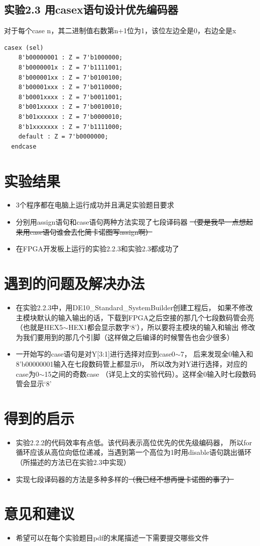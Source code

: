 \documentclass[12pt,a4paper,UTF8]{article}
\begin{document}
\subsection{实验2.3 用casex语句设计优先编码器}
对于每个case n，其二进制值右数第n+1位为1，该位左边全是0，右边全是x
\begin{lstlisting}[style=verilog-style]
  casex (sel)
    8'b00000001 : Z = 7'b1000000;
    8'b0000001x : Z = 7'b1111001;
    8'b000001xx : Z = 7'b0100100;
    8'b00001xxx : Z = 7'b0110000;
    8'b0001xxxx : Z = 7'b0011001;
    8'b001xxxxx : Z = 7'b0010010;
    8'b01xxxxxx : Z = 7'b0000010;
    8'b1xxxxxxx : Z = 7'b1111000;
    default : Z = 7'b0000000;
  endcase
\end{lstlisting}

\section{实验结果}
\begin{itemize}
  \item 3个程序都在电脑上运行成功并且满足实验题目要求
  \item 分别用assign语句和case语句两种方法实现了七段译码器
        \sout{（要是我早一点想起来用case语句谁会去化简卡诺图写assign啊）}
  \item 在FPGA开发板上运行的实验2.2.3和实验2.3都成功了
\end{itemize}

\section{遇到的问题及解决办法}
\begin{itemize}
  \item 在实验2.2.3中，用DE10\_Standard\_SystemBuilder创建工程后，
        如果不修改主模块默认的输入输出的话，下载到FPGA之后空接的那几个七段数码管会亮
        （也就是HEX5$\sim$HEX1都会显示数字`8'），所以要将主模块的输入和输出
        修改为我们要用到的那几个引脚（这样做之后编译的时候警告也会少很多）
  \item 一开始写的case语句是对Y[3:1]进行选择对应到case0$\sim$7，
        后来发现全0输入和8'b00000001输入在七段数码管上都显示0，
        所以改为对Y进行选择，对应的case为0$\sim$15之间的奇数case
        （详见上文的实验代码）。这样全0输入时七段数码管会显示`8'
\end{itemize}

\section{得到的启示}
\begin{itemize}
  \item 实验2.2.2的代码效率有点低。该代码表示高位优先的优先级编码器，
        所以for循环应该从高位向低位递减，当遇到第一个高位为1时用disable语句跳出循环
        （所描述的方法已在实验2.3中实现）
  \item 实现七段译码器的方法是多种多样的\sout{（我已经不想再提卡诺图的事了）}
\end{itemize}

\section{意见和建议}
\begin{itemize}
  \item 希望可以在每个实验题目pdf的末尾描述一下需要提交哪些文件
\end{itemize}
\end{document}
